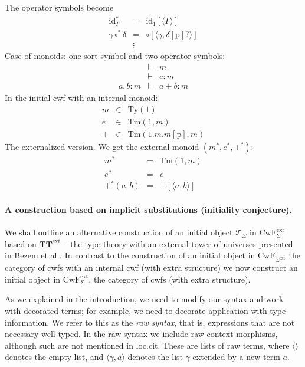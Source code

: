 \documentclass[11pt,a4paper]{article}
\theoremstyle{plain}
\theoremstyle{definition}
\newcommand{\id}{\mathsf{id}}
\newcommand{\Ty}{\mathrm{Ty}}
\newcommand{\Tm}{\mathrm{Tm}}
\newcommand{\T}{\mathsf{T}}
\def\id{\mathrm{id}}
\newcommand{\tuple}[1]{\langle #1 \rangle}
\def\p{\mathrm{p}}
\def\T{\mathcal{T}}
\def\CwF{\mathrm{CwF}}
\def\CwFextSigma{\mathrm{CwF^{ext}_\Sigma}}
\def\CwFext{\mathrm{CwF^{ext}_\Sigma}}
\def\Sigmaext{{\Sigma^\mathrm{ext}}}
\def\TText{{\mathbf{TT}^\mathrm{ext}}}
\begin{document}
The operator symbols become
\begin{eqnarray*}
\id^*_\Gamma &=& \id_1[{\tuple{\Gamma}}]\\
\gamma \circ^* \delta &=&\circ[ \tuple{\gamma,\delta[\p]?} ]\\
&\vdots&
\end{eqnarray*}
Case of monoids: one sort symbol and two operator symbols:
\begin{eqnarray*}
&\vdash& m\\
&\vdash& e : m\\
a, b : m &\vdash& a + b : m
\end{eqnarray*}
In the initial cwf with an internal monoid:
\begin{eqnarray*}
m &\in& \Ty(1)\\
e &\in& \Tm(1,m)\\
+ &\in& \Tm(1.m.m[\p],m)
\end{eqnarray*}
The externalized version. We get the external monoid $(m^*,e^*,+^*)$:
\begin{eqnarray*}
m^* &=&\Tm(1,m)\\
e^* &=& e\\
+^*(a, b) &=& +[ \tuple{a,b} ]
\end{eqnarray*}

\paragraph{A construction based on implicit substitutions (initiality conjecture).}
We shall outline an alternative construction of an initial object $\T_\Sigma$ in $\CwFextSigma$ based on $\TText$ -- the type theory with an external tower of universes presented in Bezem et al \cite{BezemCDE22}. In contrast to the construction of an initial object in $\CwF_{\Sigmaext}$ the category of cwfs with an internal cwf (with extra structure) we now construct an initial object in $\CwFext$, the category of cwfs (with extra structure).

As we explained in the introduction, we need to modify our syntax and work with decorated terms; for example, we need to decorate application with type information. We refer to this as the {\em raw syntax}, that is, expressions that are not necessary well-typed. In the raw syntax we include raw context morphisms, although such are not mentioned in loc.cit. These are lists of raw terms, where $\tuple{}$ denotes the empty list, and $\tuple{\gamma,a}$ denotes the list $\gamma$ extended by a new term $a$.
\end{document}
